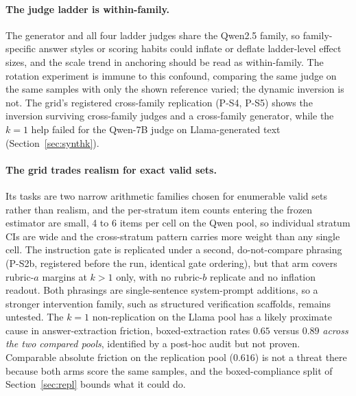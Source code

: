 \documentclass[11pt]{article}
\begin{document}
\paragraph{The judge ladder is within-family.}
The generator and all four ladder judges share the Qwen2.5 family, so family-specific answer styles or scoring habits could inflate or deflate ladder-level effect sizes, and the scale trend in anchoring should be read as within-family.
The rotation experiment is immune to this confound, comparing the same judge on the same samples with only the shown reference varied; the dynamic inversion is not.
The grid's registered cross-family replication (P-S4, P-S5) shows the inversion surviving cross-family judges and a cross-family generator, while the $k{=}1$ help failed for the Qwen-7B judge on Llama-generated text (Section~\ref{sec:synthk}).

\paragraph{The grid trades realism for exact valid sets.}
Its tasks are two narrow arithmetic families chosen for enumerable valid sets rather than realism, and the per-stratum item counts entering the frozen estimator are small, 4 to 6 items per cell on the Qwen pool, so individual stratum CIs are wide and the cross-stratum pattern carries more weight than any single cell.
The instruction gate is replicated under a second, do-not-compare phrasing (P-S2b, registered before the run, identical gate ordering), but that arm covers rubric-$a$ margins at $k{>}1$ only, with no rubric-$b$ replicate and no inflation readout.
Both phrasings are single-sentence system-prompt additions, so a stronger intervention family, such as structured verification scaffolds, remains untested.
The $k{=}1$ non-replication on the Llama pool has a likely proximate cause in answer-extraction friction, boxed-extraction rates $0.65$ versus $0.89$ \emph{across the two compared pools}, identified by a post-hoc audit but not proven.
Comparable absolute friction on the replication pool ($0.616$) is not a threat there because both arms score the same samples, and the boxed-compliance split of Section~\ref{sec:repl} bounds what it could do.
\end{document}
